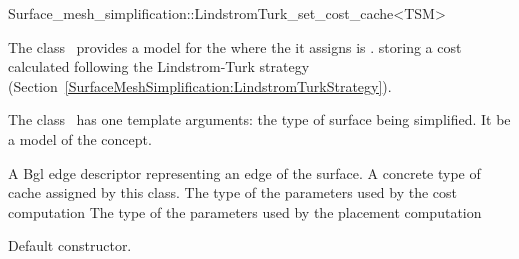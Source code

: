 

\begin{ccRefClass}{Surface_mesh_simplification::LindstromTurk_set_cost_cache<TSM>}


\ccDefinition

The class \ccRefName\ provides a model for the
 where the  it assigns is .
storing a cost calculated following the Lindstrom-Turk strategy
(Section~\ref{SurfaceMeshSimplification:LindstromTurkStrategy}).

The class \ccRefName\ has one template arguments: the type of surface being simplified. 
It be a model of the  concept.

\ccIsModel
{}


\ccTypes
  \ccGlue
  {A {\sc Bgl} edge descriptor representing an edge of the surface.}
  \ccGlue
  {A concrete type of cache assigned by this class.}
  \ccGlue
  {The type of the parameters used by the cost computation}
  \ccGlue
  {The type of the parameters used by the placement computation}
            
\ccCreation
{}  %

{Default constructor.}


\end{ccRefClass}
